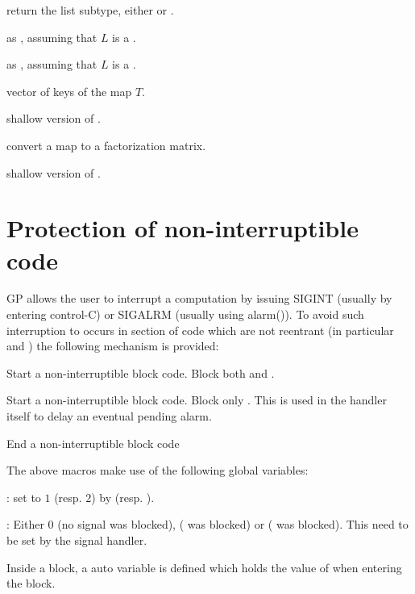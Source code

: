  return the list subtype, either  or
.

 as ,
assuming that $L$ is a .

 as ,
assuming that $L$ is a .

 vector of keys of the map $T$.

 shallow version of .

 convert a map to a factorization matrix.

 shallow version of .

\section{Protection of non-interruptible code}

GP allows the user to interrupt a computation by issuing SIGINT
(usually by entering control-C) or SIGALRM (usually using alarm()).
To avoid such interruption to occurs in section of code which are not
reentrant (in particular  and )
the following mechanism is provided:

  Start a non-interruptible block code. Block both  and .

  Start a non-interruptible block code. Block only .
This is used in the  handler itself to delay an eventual pending
alarm.

  End a non-interruptible block code

The above macros make use of the following global variables:

: set to $1$ (resp. $2$) by 
(resp. ).

: Either $0$ (no signal was blocked), 
( was blocked) or  ( was blocked).
This need to be set by the signal handler.

Inside a block, a auto variable  is defined which holds the
value of  when entering the block.


